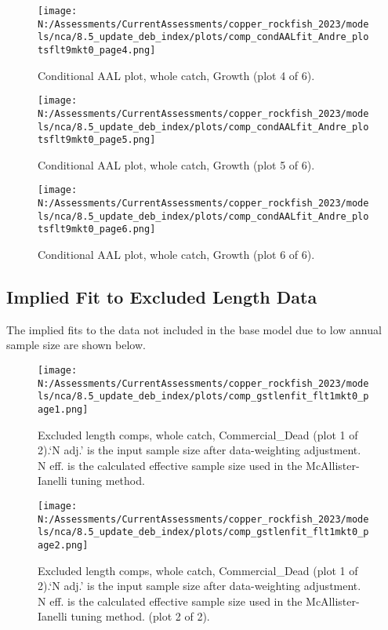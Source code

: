 \documentclass[11pt,
  english,
  letterpaper,
]{article}
\begin{document}
\begin{figure}
\centering
\texttt{[image: N:/Assessments/CurrentAssessments/copper\_rockfish\_2023/models/nca/8.5\_update\_deb\_index/plots/comp\_condAALfit\_Andre\_plotsflt9mkt0\_page4.png]}
\caption{Conditional AAL plot, whole catch, Growth (plot 4 of 6).\label{fig:comp_condAALfit_Andre_plotsflt9mkt0_page4}}
\end{figure}

\begin{figure}
\centering
\texttt{[image: N:/Assessments/CurrentAssessments/copper\_rockfish\_2023/models/nca/8.5\_update\_deb\_index/plots/comp\_condAALfit\_Andre\_plotsflt9mkt0\_page5.png]}
\caption{Conditional AAL plot, whole catch, Growth (plot 5 of 6).\label{fig:comp_condAALfit_Andre_plotsflt9mkt0_page5}}
\end{figure}

\begin{figure}
\centering
\texttt{[image: N:/Assessments/CurrentAssessments/copper\_rockfish\_2023/models/nca/8.5\_update\_deb\_index/plots/comp\_condAALfit\_Andre\_plotsflt9mkt0\_page6.png]}
\caption{Conditional AAL plot, whole catch, Growth (plot 6 of 6).\label{fig:comp_condAALfit_Andre_plotsflt9mkt0_page6}}
\end{figure}

\hypertarget{excluded-data}{%
\subsection{Implied Fit to Excluded Length Data}\label{excluded-data}}

The implied fits to the data not included in the base model due to low annual sample size are shown below.

\begin{figure}
\centering
\texttt{[image: N:/Assessments/CurrentAssessments/copper\_rockfish\_2023/models/nca/8.5\_update\_deb\_index/plots/comp\_gstlenfit\_flt1mkt0\_page1.png]}
\caption{Excluded length comps, whole catch, Commercial\_Dead (plot 1 of 2).`N adj.' is the input sample size after data-weighting adjustment. N eff. is the calculated effective sample size used in the McAllister-Ianelli tuning method.\label{fig:comp_gstlenfit_flt1mkt0_page1}}
\end{figure}

\begin{figure}
\centering
\texttt{[image: N:/Assessments/CurrentAssessments/copper\_rockfish\_2023/models/nca/8.5\_update\_deb\_index/plots/comp\_gstlenfit\_flt1mkt0\_page2.png]}
\caption{Excluded length comps, whole catch, Commercial\_Dead (plot 1 of 2).`N adj.' is the input sample size after data-weighting adjustment. N eff. is the calculated effective sample size used in the McAllister-Ianelli tuning method. (plot 2 of 2).\label{fig:comp_gstlenfit_flt1mkt0_page2}}
\end{figure}
\end{document}
